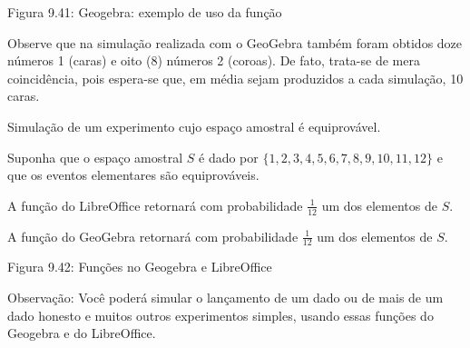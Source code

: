 Figura 9.41: Geogebra: exemplo de uso da função 

Observe que na simulação realizada com o GeoGebra também foram obtidos doze números 1 (caras) e oito (8) números 2 (coroas). De fato, trata-se de mera coincidência, pois espera-se que, em média sejam produzidos a cada simulação, 10 caras.

\begin{example}{Simulação de um experimento cujo espaço amostral é equiprovável.}

Suponha que o espaço amostral \(S\) é dado por \(\{ 1,2,3,4,5,6,7,8,9,10,11,12\}\) e que os eventos elementares são equiprováveis.

A função do LibreOffice  retornará com probabilidade \(\frac{1}{12}\) um dos elementos de \(S\).

A função do GeoGebra  retornará com probabilidade \(\frac{1}{12}\) um dos elementos de \(S\).
\label{\detokenize{PE511-A:id4}}
\begin{figure}[H]
\centering

\noindent{}
\label{\detokenize{PE511-A:id4}}\end{figure}

Figura 9.42: Funções no Geogebra e LibreOffice

Observação:  Você poderá simular o lançamento de um dado ou de mais de um dado honesto e muitos outros experimentos simples, usando essas funções do Geogebra e do LibreOffice.
\end{example}
